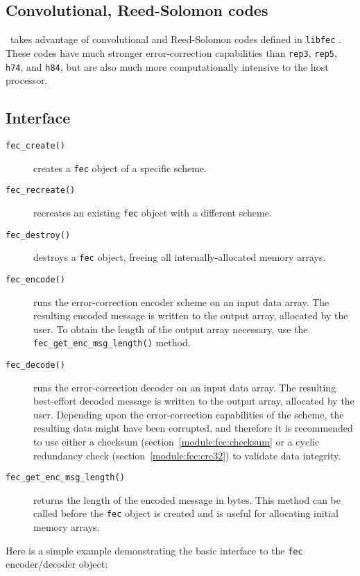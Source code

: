 \subsection{Convolutional, Reed-Solomon codes}
\label{module:fec:conv}
\liquid\ takes advantage of convolutional and Reed-Solomon codes defined in
{\tt libfec} \cite{fec:web}.
These codes have much stronger error-correction capabilities than {\tt rep3},
{\tt rep5}, {\tt h74}, and {\tt h84}, but are also much more computationally
intensive to the host processor.

\subsection{Interface}
\label{module:fec:interface}

\begin{description}
\item[{\tt fec\_create()}]
    creates a {\tt fec} object of a specific scheme.
\item[{\tt fec\_recreate()}]
    recreates an existing {\tt fec} object with a different scheme.
\item[{\tt fec\_destroy()}]
    destroys a {\tt fec} object, freeing all internally-allocated memory
    arrays.
\item[{\tt fec\_encode()}]
    runs the error-correction encoder scheme on an input data array.
    The resulting encoded message is written to the output array, allocated by
    the user.
    To obtain the length of the output array necessary, use the
    {\tt fec\_get\_enc\_msg\_length()} method.
\item[{\tt fec\_decode()}]
    runs the error-correction decoder on an input data array.
    The resulting best-effort decoded message is written to the output array,
    allocated by the user.
    Depending upon the error-correction capabilities of the scheme, the
    resulting data might have been corrupted, and therefore it is recommended
    to use either a
    checksum (section~\ref{module:fec:checksum} or a
    cyclic redundancy check (section~\ref{module:fec:crc32})
    to validate data integrity.
\item[{\tt fec\_get\_enc\_msg\_length()}]
    returns the length of the encoded message in bytes.
    This method can be called before the {\tt fec} object is created and is
    useful for allocating initial memory arrays.
\end{description}

Here is a simple example demonstrating the basic interface to the {\tt fec}
encoder/decoder object:


